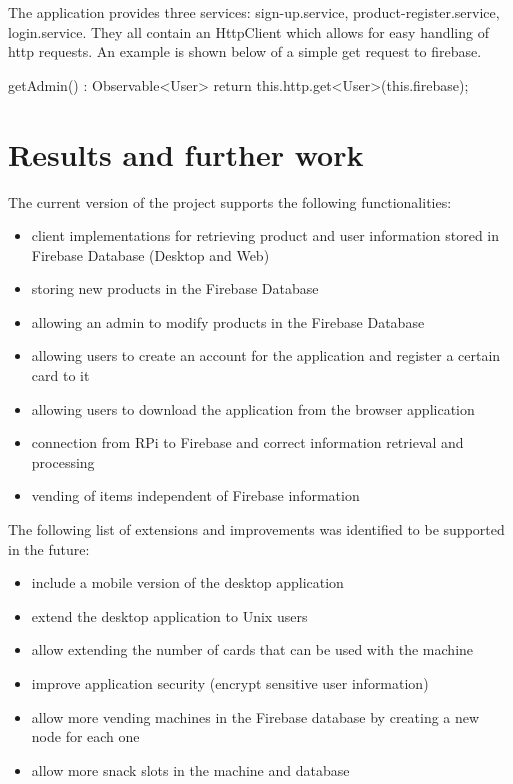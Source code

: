 \documentclass[a4paper,11pt]{article}
\begin{document}
The application provides three services: sign-up.service, product-register.service, login.service. They all contain an HttpClient
which allows for easy handling of http requests. An example is shown below of a simple get request to firebase.
\begin{python}
getAdmin() : Observable<User>{
    return this.http.get<User>(this.firebase);
  }
\end{python}
\section{Results and further work}

The current version of the project supports the following functionalities:
\begin{itemize}
\item client implementations for retrieving product and user information stored in Firebase Database (Desktop and Web)
\item storing new products in the Firebase Database
\item allowing an admin to modify products in the Firebase Database
\item allowing users to create an account for the application and register a certain card to it
\item allowing users to download the application from the browser application
\item connection from RPi to Firebase and correct information retrieval and processing
\item vending of items independent of Firebase information\\
\end{itemize}

The following list of extensions and improvements was identified to be supported in the future:
\begin{itemize}
\item include a mobile version of the desktop application
\item extend the desktop application to Unix users
\item allow extending the number of cards that can be used with the machine 
\item improve application security (encrypt sensitive user information)
\item allow more vending machines in the Firebase database by creating a new node for each one
\item allow more snack slots in the machine and database
\end{itemize}
\end{document}
